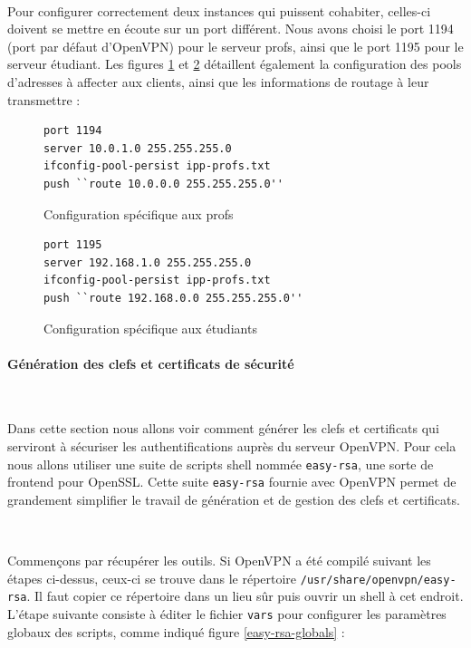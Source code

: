 ~

Pour configurer correctement deux instances qui puissent cohabiter, celles-ci doivent se mettre en écoute sur un port différent. Nous avons choisi le port 1194 (port par défaut d'OpenVPN) pour le serveur profs, ainsi que le port 1195 pour le serveur étudiant. Les figures \ref{configuration_base_prof} et \ref{configuration_base_student} détaillent également la configuration des pools d'adresses à affecter aux clients, ainsi que les informations de routage à leur transmettre :

\begin{figure}[H]
	\begin{lstlisting}[frame=trBL]
port 1194
server 10.0.1.0 255.255.255.0
ifconfig-pool-persist ipp-profs.txt
push ``route 10.0.0.0 255.255.255.0''
	\end{lstlisting}
	\caption{Configuration spécifique aux profs}
	\label{configuration_base_prof}
\end{figure}
\begin{figure}[H]
	\begin{lstlisting}[frame=trBL]
port 1195
server 192.168.1.0 255.255.255.0
ifconfig-pool-persist ipp-profs.txt
push ``route 192.168.0.0 255.255.255.0''
	\end{lstlisting}
	\caption{Configuration spécifique aux étudiants}
	\label{configuration_base_student}
\end{figure}


\paragraph{Génération des clefs et certificats de sécurité}
~

Dans cette section nous allons voir comment générer les clefs et certificats qui serviront à sécuriser les authentifications auprès du serveur OpenVPN. Pour cela nous allons utiliser une suite de scripts shell nommée \verb|easy-rsa|, une sorte de frontend pour OpenSSL. Cette suite \verb|easy-rsa| fournie avec OpenVPN permet de grandement simplifier le travail de génération et de gestion des clefs et certificats.

~

Commençons par récupérer les outils. Si OpenVPN a été compilé suivant les étapes ci-dessus, ceux-ci se trouve dans le répertoire \verb|/usr/share/openvpn/easy-rsa|. Il faut copier ce répertoire dans un lieu sûr puis ouvrir un shell à cet endroit. L'étape suivante consiste à éditer le fichier \verb|vars| pour configurer les paramètres globaux des scripts, comme indiqué figure \ref{easy-rsa-globals} :


